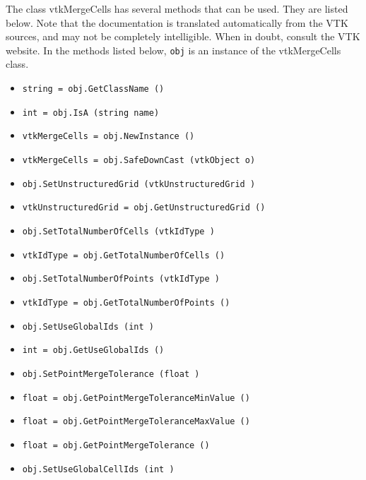 The class vtkMergeCells has several methods that can be used.
  They are listed below.
Note that the documentation is translated automatically from the VTK sources,
and may not be completely intelligible.  When in doubt, consult the VTK website.
In the methods listed below, \verb|obj| is an instance of the vtkMergeCells class.
\begin{itemize}
\item  \verb|string = obj.GetClassName ()|

\item  \verb|int = obj.IsA (string name)|

\item  \verb|vtkMergeCells = obj.NewInstance ()|

\item  \verb|vtkMergeCells = obj.SafeDownCast (vtkObject o)|

\item  \verb|obj.SetUnstructuredGrid (vtkUnstructuredGrid )|

\item  \verb|vtkUnstructuredGrid = obj.GetUnstructuredGrid ()|

\item  \verb|obj.SetTotalNumberOfCells (vtkIdType )|

\item  \verb|vtkIdType = obj.GetTotalNumberOfCells ()|

\item  \verb|obj.SetTotalNumberOfPoints (vtkIdType )|

\item  \verb|vtkIdType = obj.GetTotalNumberOfPoints ()|

\item  \verb|obj.SetUseGlobalIds (int )|

\item  \verb|int = obj.GetUseGlobalIds ()|

\item  \verb|obj.SetPointMergeTolerance (float )|

\item  \verb|float = obj.GetPointMergeToleranceMinValue ()|

\item  \verb|float = obj.GetPointMergeToleranceMaxValue ()|

\item  \verb|float = obj.GetPointMergeTolerance ()|

\item  \verb|obj.SetUseGlobalCellIds (int )|


\end{itemize}
